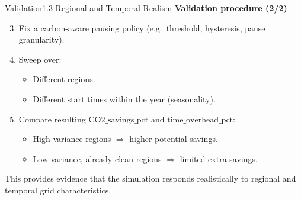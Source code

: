 \begin{frame}{Validation}{1.3 Regional and Temporal Realism}
  \textbf{Validation procedure (2/2)}
  \begin{enumerate}
    \setcounter{enumi}{2}
    \item Fix a carbon-aware pausing policy
      (e.g.\ threshold, hysteresis, pause granularity).
    \item Sweep over:
      \begin{itemize}
        \item Different regions.
        \item Different start times within the year (seasonality).
      \end{itemize}
    \item Compare resulting
      $\text{CO2\_savings\_pct}$ and $\text{time\_overhead\_pct}$:
      \begin{itemize}
        \item High-variance regions $\Rightarrow$ higher potential savings.
        \item Low-variance, already-clean regions $\Rightarrow$ limited extra savings.
      \end{itemize}
  \end{enumerate}

  \vspace{0.2cm}
  This provides evidence that the simulation responds realistically to regional and
  temporal grid characteristics.
\end{frame}